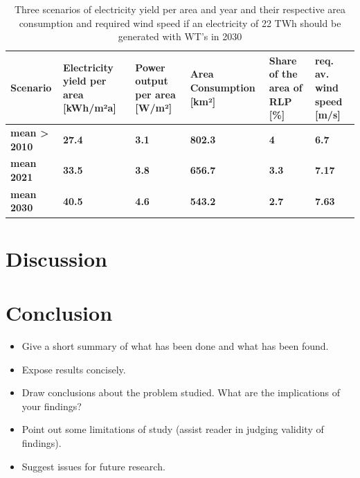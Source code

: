 \documentclass[a4paper,11pt]{article}
\begin{document}
\begin{table}[H]

\caption{\label{tab:table2}Three scenarios of electricity yield per area and year and their respective area consumption 
  and required wind speed if an electricity of 22 TWh should be generated with WT's in 2030}
\centering
\begin{tabular}[t]{>{\raggedright\arraybackslash}p{2.2cm}>{\raggedright\arraybackslash}p{2.2cm}>{\raggedright\arraybackslash}p{2.2cm}>{\raggedright\arraybackslash}p{2.2cm}>{\raggedright\arraybackslash}p{2.2cm}>{\raggedright\arraybackslash}p{2.2cm}}
\toprule
Scenario & Electricity yield per area [kWh/m²a] & Power output per area [W/m²] & Area Consumption [km²] & Share of the area of RLP [\%] & req. av. wind speed [m/s]\\
\midrule
\textbf{mean > 2010} & \textbf{27.4} & \textbf{3.1} & \textbf{802.3} & \textbf{4} & \textbf{6.7}\\
\midrule
\textbf{mean 2021} & \textbf{33.5} & \textbf{3.8} & \textbf{656.7} & \textbf{3.3} & \textbf{7.17}\\
\midrule
\textbf{mean 2030} & \textbf{40.5} & \textbf{4.6} & \textbf{543.2} & \textbf{2.7} & \textbf{7.63}\\
\midrule
\bottomrule
\end{tabular}
\end{table}
\hypertarget{discussion}{%
\section{Discussion}\label{discussion}}

\hypertarget{conclusion}{%
\section{Conclusion}\label{conclusion}}
\begin{itemize}
\item
  Give a short summary of what has been done and what has been found.
\item
  Expose results concisely.
\item
  Draw conclusions about the problem studied. What are the implications of your
  findings?
\item
  Point out some limitations of study (assist reader in judging validity of
  findings).
\item
  Suggest issues for future research.
\end{itemize}
\newpage
\end{document}
